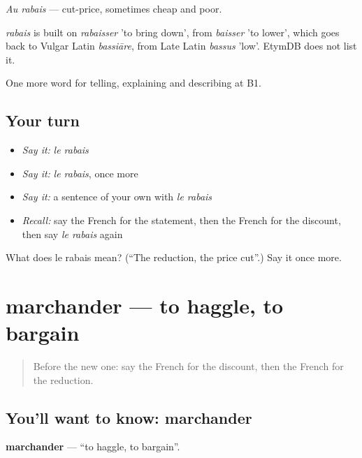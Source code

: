 \emph{Au rabais} — cut-price, sometimes cheap and poor.

\begin{cousinweb}
\emph{rabais} is built on \emph{rabaisser} 'to bring down', from \emph{baisser} 'to lower', which goes back to Vulgar Latin \emph{bassiāre}, from Late Latin \emph{bassus} 'low'. EtymDB does not list it.
\end{cousinweb}

\begin{grammarlens}[title={What you've built}]
One more word for telling, explaining and describing at B1.
\end{grammarlens}

\subsection*{Your turn}
\begin{itemize}
\raggedright
  \item \emph{Say it:} \emph{le rabais}
  \item \emph{Say it:} \emph{le rabais}, once more
  \item \emph{Say it:} a sentence of your own with \emph{le rabais}
  \item \emph{Recall:} say the French for the statement, then the French for the discount, then say \emph{le rabais} again
\end{itemize}

\begin{tcolorbox}[breakable,colback=teal!4,colframe=teal!35!black,title={Before you move on}]
What does le rabais mean? (\textquotedblleft{}The reduction, the price cut\textquotedblright{}.) Say it once more.
\end{tcolorbox}
\section[marchander]{marchander — to haggle, to bargain}

\label{lesson:FR-C452-marchander}



\begin{quote}
Before the new one: say the French for the discount, then the French for the reduction.
\end{quote}

\subsection*{You'll want to know: marchander}
\textbf{marchander} — \textquotedblleft{}to haggle, to bargain\textquotedblright{}.

